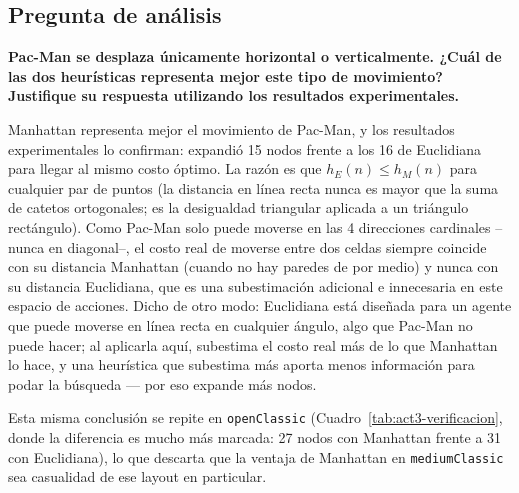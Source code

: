 \subsection{Pregunta de análisis}

\textbf{Pac-Man se desplaza únicamente horizontal o verticalmente. ¿Cuál de las dos heurísticas
representa mejor este tipo de movimiento? Justifique su respuesta utilizando los resultados
experimentales.}

Manhattan representa mejor el movimiento de Pac-Man, y los resultados experimentales lo confirman:
expandió 15 nodos frente a los 16 de Euclidiana para llegar al mismo costo óptimo. La razón es que
$h_E(n) \le h_M(n)$ para cualquier par de puntos (la distancia en línea recta nunca es mayor que la
suma de catetos ortogonales; es la desigualdad triangular aplicada a un triángulo rectángulo). Como
Pac-Man solo puede moverse en las 4 direcciones cardinales --nunca en diagonal--, el costo real de
moverse entre dos celdas siempre coincide con su distancia Manhattan (cuando no hay paredes de por
medio) y nunca con su distancia Euclidiana, que es una subestimación adicional e innecesaria en
este espacio de acciones. Dicho de otro modo: Euclidiana está diseñada para un agente que puede
moverse en línea recta en cualquier ángulo, algo que Pac-Man no puede hacer; al aplicarla aquí,
subestima el costo real más de lo que Manhattan lo hace, y una heurística que subestima más aporta
menos información para podar la búsqueda --- por eso expande más nodos.

Esta misma conclusión se repite en \texttt{openClassic} (Cuadro~\ref{tab:act3-verificacion}, donde
la diferencia es mucho más marcada: 27 nodos con Manhattan frente a 31 con Euclidiana), lo que
descarta que la ventaja de Manhattan en \texttt{mediumClassic} sea casualidad de ese layout en
particular.
